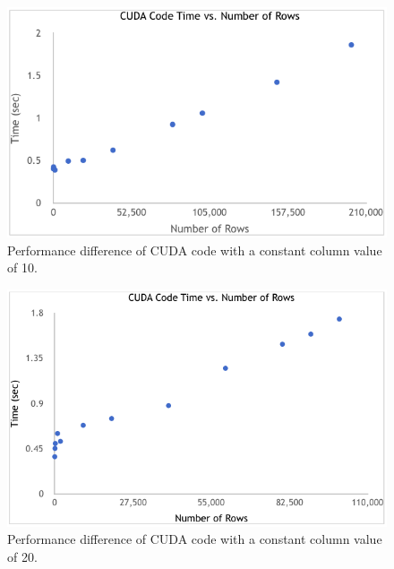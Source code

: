 \documentclass[letterpaper, 10 pt, conference]{ieeeconf}  %
\begin{document}
	\begin{figure}[thpb]
		\centering
		\includegraphics[width=\linewidth]{cudarow10.png}
		\caption{Performance difference of CUDA code with a constant column value of 10.}
	\end{figure}

	\begin{figure}[thpb]
		\centering
		\includegraphics[width=\linewidth]{cudarow20.png}
		\caption{Performance difference of CUDA code with a constant column value of 20.}
	\end{figure}	


\end{document}
